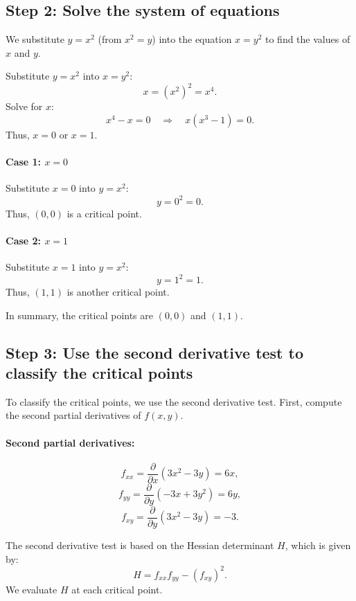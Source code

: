 \documentclass[11pt]{article}
\begin{document}
\subsection{Step 2: Solve the system of equations}

We substitute \( y = x^2 \) (from \( x^2 = y \)) into the equation \( x = y^2 \) to find the values of \( x \) and \( y \).

Substitute \( y = x^2 \) into \( x = y^2 \):
\[
x = (x^2)^2 = x^4.
\]
Solve for \( x \):
\[
x^4 - x = 0 \quad \Rightarrow \quad x(x^3 - 1) = 0.
\]
Thus, \( x = 0 \) or \( x = 1 \).

\paragraph{Case 1: \( x = 0 \)}
Substitute \( x = 0 \) into \( y = x^2 \):
\[
y = 0^2 = 0.
\]
Thus, \( (0, 0) \) is a critical point.

\paragraph{Case 2: \( x = 1 \)}
Substitute \( x = 1 \) into \( y = x^2 \):
\[
y = 1^2 = 1.
\]
Thus, \( (1, 1) \) is another critical point.

In summary, the critical points are \( (0, 0) \) and \( (1, 1) \).

\newpage

\subsection{Step 3: Use the second derivative test to classify the critical points}

To classify the critical points, we use the second derivative test. First, compute the second partial derivatives of \( f(x, y) \).

\paragraph{Second partial derivatives:}
\[
f_{xx} = \frac{\partial}{\partial x} \left( 3x^2 - 3y \right) = 6x,
\]
\[
f_{yy} = \frac{\partial}{\partial y} \left( -3x + 3y^2 \right) = 6y,
\]
\[
f_{xy} = \frac{\partial}{\partial y} \left( 3x^2 - 3y \right) = -3.
\]

The second derivative test is based on the Hessian determinant \( H \), which is given by:
\[
H = f_{xx} f_{yy} - (f_{xy})^2.
\]
We evaluate \( H \) at each critical point.
\end{document}
